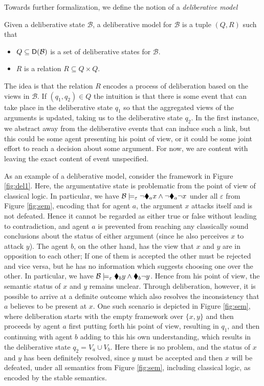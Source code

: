 \documentclass[greybox]{svmult}
\newcommand{\dstate}[1]{\sf D({#1}) }
\newcommand{\views}{\mathcal B}
\newcommand{\sem}{\varepsilon}
\begin{document}
Towards further formalization, we define the notion of a \emph{deliberative model}

\begin{definition}\label{def:dk}
Given a deliberative state $\views$, a deliberative model for $\views$ is a tuple $(Q,R)$ such that
\begin{itemize}
\item $Q \subseteq \dstate \views$ is a set of deliberative states for $\views$.
\item $R$ is a relation $R \subseteq Q \times Q$.
\end{itemize}
\end{definition}

The idea is that the relation $R$ encodes a process of deliberation based on the views in $\views$. If $(q_1,q_2) \in Q$ the intuition is that there is some event that can take place in the deliberative state $q_1$ so that the aggregated views of the arguments is updated, taking us to the deliberative state $q_2$. In the first instance, we abstract away from the deliberative events that can induce such a link, but this could be some agent presenting his point of view, or it could be some joint effort to reach a decision about some argument. For now, we are content with leaving the exact content of event unspecified. 

As an example of a deliberative model, consider the framework in Figure \ref{fig:del1}. Here, the argumentative state is problematic from the point of view of classical logic. In particular, we have $\views \models_\sem \neg \cdia_a x \land \neg \cdia_a \neg x$ under all $\sem$ from Figure \ref{fig:sem}, encoding that for agent $a$, the argument $x$ attacks itself and is not defeated. Hence it cannot be regarded as either true or false without leading to contradiction, and agent $a$ is prevented from reaching any classically sound conclusions about the status of either argument (since he also perceives $x$ to attack $y$). The agent $b$, on the other hand, has the view that $x$ and $y$ are in opposition to each other; If one of them is accepted the other must be rejected and vice versa, but he has no information which suggests choosing one over the other. In particular, we have $\views \models_\sem \cdia_b y \land \cdia_b \neg y$. Hence from his point of view, the semantic status of $x$ and $y$ remains unclear. Through deliberation, however, it is possible to arrive at a definite outcome which also resolves the inconsistency that $a$ believes to be present at $x$. One such scenario is depicted in Figure \ref{fig:sem}, where deliberation starts with the empty framework over $\{x,y\}$ and then proceeds by agent $a$ first putting forth his point of view, resulting in $q_1$, and then continuing with agent $b$ adding to this his own understanding, which results in the deliberative state $q_2 = V_a \cup V_b$. Here there is no problem, and the status of $x$ and $y$ has been definitely resolved, since $y$ must be accepted and then $x$ will be defeated, under all semantics from Figure \ref{fig:sem}, including classical logic, as encoded by the stable semantics.
\end{document}
